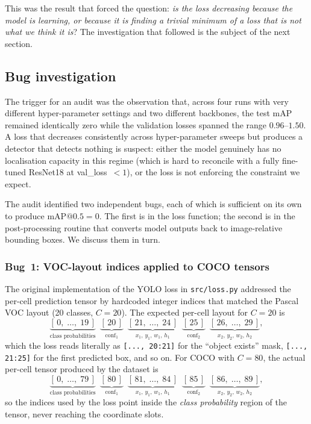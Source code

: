 This was the result that forced the question: \emph{is the loss decreasing
because the model is learning, or because it is finding a trivial minimum of a
loss that is not what we think it is}? The investigation that followed is the
subject of the next section.

\subsection{Bug investigation}
\label{sec:bug-investigation}

The trigger for an audit was the observation that, across four runs with very
different hyper-parameter settings and two different backbones, the test mAP
remained identically zero while the validation losses spanned the range
$0.96$--$1.50$. A loss that decreases consistently across hyper-parameter
sweeps but produces a detector that detects nothing is suspect: either the
model genuinely has no localisation capacity in this regime (which is hard to
reconcile with a fully fine-tuned ResNet18 at val\_loss~$<\!1$), or the loss is
not enforcing the constraint we expect.

The audit identified two independent bugs, each of which is sufficient on its
own to produce $\mathrm{mAP}@0.5 = 0$. The first is in the loss function; the
second is in the post-processing routine that converts model outputs back to
image-relative bounding boxes. We discuss them in turn.

\subsubsection{Bug~1: VOC-layout indices applied to COCO tensors}
\label{sec:bug:loss-indices}

The original implementation of the YOLO loss in \texttt{src/loss.py} addressed
the per-cell prediction tensor by hardcoded integer indices that matched the
Pascal VOC layout (20 classes, $C=20$). The expected per-cell layout for
$C=20$ is
\[
  \underbrace{[\,0,\;\ldots,\;19\,]}_{\text{class probabilities}}\;\;
  \underbrace{[\,20\,]}_{\text{conf}_1}\;\;
  \underbrace{[\,21,\;\ldots,\;24\,]}_{x_1,\,y_1,\,w_1,\,h_1}\;\;
  \underbrace{[\,25\,]}_{\text{conf}_2}\;\;
  \underbrace{[\,26,\;\ldots,\;29\,]}_{x_2,\,y_2,\,w_2,\,h_2},
\]
which the loss reads literally as \texttt{[..., 20:21]} for the
``object exists'' mask, \texttt{[..., 21:25]} for the first predicted box, and
so on. For COCO with $C=80$, the actual per-cell tensor produced by the
dataset is
\[
  \underbrace{[\,0,\;\ldots,\;79\,]}_{\text{class probabilities}}\;\;
  \underbrace{[\,80\,]}_{\text{conf}_1}\;\;
  \underbrace{[\,81,\;\ldots,\;84\,]}_{x_1,\,y_1,\,w_1,\,h_1}\;\;
  \underbrace{[\,85\,]}_{\text{conf}_2}\;\;
  \underbrace{[\,86,\;\ldots,\;89\,]}_{x_2,\,y_2,\,w_2,\,h_2},
\]
so the indices used by the loss point inside the \emph{class probability}
region of the tensor, never reaching the coordinate slots.

